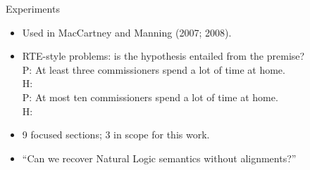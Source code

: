 \documentclass[hyperref]{beamer}
\begin{document}
\begin{frame}{Experiments}
\begin{itemize}
  \item Used in MacCartney and Manning (2007; 2008).
  \item RTE-style problems: is the hypothesis entailed from the premise? \\
  \pause
    \vspace{0.1cm}
    P: At least three commissioners spend a lot of time at home. \\
    H:  \\
    \vspace{0.1cm}
    \pause
    P: At most ten commissioners spend a lot of time at home. \\
    H: 
    \vspace{0.1cm}
  \pause
  \item 9 focused sections; 3 in scope for this work.
\end{itemize}
\vspace{0.5cm}
\pause

\begin{itemize}
  \item ``Can we recover Natural Logic semantics without alignments?''
\end{itemize}
\end{frame}
\end{document}
